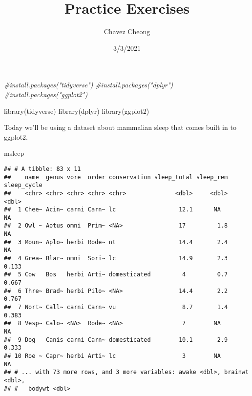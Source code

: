 \documentclass[]{article}
\title{Practice Exercises}
\author{Chavez Cheong}
\date{3/3/2021}
\newenvironment{Shaded}{\begin{snugshade}}{\end{snugshade}}
\newcommand{\CommentTok}[1]{\textcolor[rgb]{0.56,0.35,0.01}{\textit{#1}}}
\newcommand{\FunctionTok}[1]{\textcolor[rgb]{0.00,0.00,0.00}{#1}}
\newcommand{\NormalTok}[1]{#1}
\begin{document}
\maketitle

\begin{Shaded}
\begin{Highlighting}[]
\CommentTok{\#install.packages("tidyverse")}
\CommentTok{\#install.packages("dplyr")}
\CommentTok{\#install.packages("ggplot2")}
\end{Highlighting}
\end{Shaded}

\begin{Shaded}
\begin{Highlighting}[]
\FunctionTok{library}\NormalTok{(tidyverse)}
\FunctionTok{library}\NormalTok{(dplyr)}
\FunctionTok{library}\NormalTok{(ggplot2)}
\end{Highlighting}
\end{Shaded}

Today we'll be using a dataset about mammalian sleep that comes built in
to ggplot2.

\begin{Shaded}
\begin{Highlighting}[]
\NormalTok{msleep}
\end{Highlighting}
\end{Shaded}

\begin{verbatim}
## # A tibble: 83 x 11
##    name  genus vore  order conservation sleep_total sleep_rem sleep_cycle
##    <chr> <chr> <chr> <chr> <chr>              <dbl>     <dbl>       <dbl>
##  1 Chee~ Acin~ carni Carn~ lc                  12.1      NA        NA    
##  2 Owl ~ Aotus omni  Prim~ <NA>                17         1.8      NA    
##  3 Moun~ Aplo~ herbi Rode~ nt                  14.4       2.4      NA    
##  4 Grea~ Blar~ omni  Sori~ lc                  14.9       2.3       0.133
##  5 Cow   Bos   herbi Arti~ domesticated         4         0.7       0.667
##  6 Thre~ Brad~ herbi Pilo~ <NA>                14.4       2.2       0.767
##  7 Nort~ Call~ carni Carn~ vu                   8.7       1.4       0.383
##  8 Vesp~ Calo~ <NA>  Rode~ <NA>                 7        NA        NA    
##  9 Dog   Canis carni Carn~ domesticated        10.1       2.9       0.333
## 10 Roe ~ Capr~ herbi Arti~ lc                   3        NA        NA    
## # ... with 73 more rows, and 3 more variables: awake <dbl>, brainwt <dbl>,
## #   bodywt <dbl>
\end{verbatim}
\end{document}
